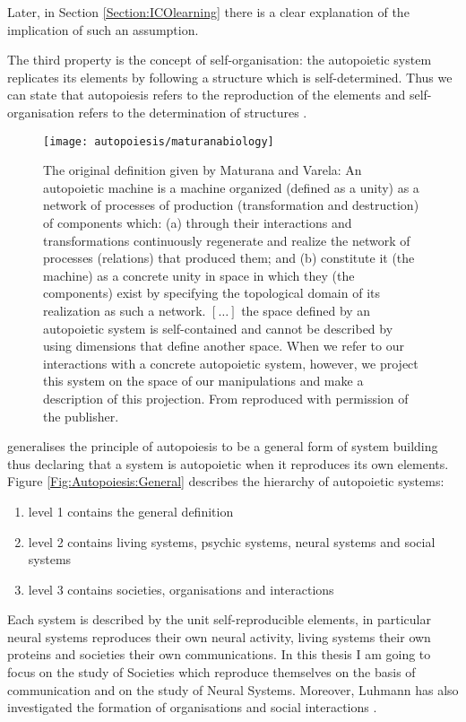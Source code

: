 Later, in Section \ref{Section:ICOlearning} there is a clear explanation of the
implication of such an assumption.

The third property is the concept of self-organisation: the autopoietic system replicates
its elements by following a structure which is self-determined.
Thus we can  state that autopoiesis refers to the reproduction of the elements
and self-organisation refers to the determination of structures \citep{Luhmann2000}.

\begin{figure}[htbp]
\begin{center}
\texttt{[image: autopoiesis/maturanabiology]}
\end{center}
\small{
\caption[Biological definition of autopoiesis]{The original definition given by Maturana and Varela:
An autopoietic machine is a machine organized (defined as a unity) as a network
of processes of production (transformation and destruction) of components which:
(a) through their interactions and transformations continuously regenerate and
realize the network of processes (relations) that produced them; and (b) constitute
 it (the machine) as a concrete unity in space in which they (the components)
exist by specifying the topological domain of its realization as such a network.
$[\dots]$ the space defined by an autopoietic system is self-contained and cannot be
described by using dimensions that define another space. When we refer to our
interactions with a concrete autopoietic system, however, we project this system
 on the space of our manipulations and make a description of this projection.
From \citet{Maturana1980} reproduced with permission of the publisher.
\label{Fig:Autopoiesis:System}}}
\end{figure}

\citet{Luhmann2000} generalises the principle of autopoiesis to be a general form of system building
thus declaring that a system is autopoietic when it reproduces its own elements.
Figure \ref{Fig:Autopoiesis:General} describes the hierarchy of autopoietic systems:
\begin{enumerate}
 \item level 1 contains the general definition
 \item level 2 contains living systems, psychic systems, neural systems and social systems
 \item level 3 contains societies, organisations and interactions
\end{enumerate}
Each system is described by the unit self-reproducible elements, in particular neural systems 
reproduces their own neural activity, living systems their own proteins and societies
 their own communications. 
In this thesis I am going to focus on the study of Societies \citep{Luhmann95}
which reproduce
themselves on the basis of communication and on the study of Neural Systems.
Moreover, Luhmann has also investigated the formation of organisations \citep{Luhmann2000} 
and social interactions \citep{Luhmann1993}.

